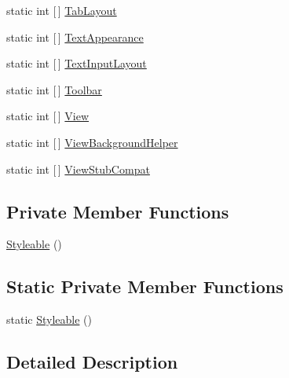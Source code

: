 \begin{DoxyCompactItemize}
\item 
static int \mbox{[}$\,$\mbox{]} \mbox{\hyperlink{class_f_w_p_s___app_1_1_droid_1_1_resource_1_1_styleable_a9f300f2b554385de63a2ce58b4f2ca8e}{Tab\+Layout}}
\item 
static int \mbox{[}$\,$\mbox{]} \mbox{\hyperlink{class_f_w_p_s___app_1_1_droid_1_1_resource_1_1_styleable_a2e843bb3176f9a0b1a185f3d1b6131b6}{Text\+Appearance}}
\item 
static int \mbox{[}$\,$\mbox{]} \mbox{\hyperlink{class_f_w_p_s___app_1_1_droid_1_1_resource_1_1_styleable_ac2d428adf08a5108608b81bd2b5e36e1}{Text\+Input\+Layout}}
\item 
static int \mbox{[}$\,$\mbox{]} \mbox{\hyperlink{class_f_w_p_s___app_1_1_droid_1_1_resource_1_1_styleable_a5c91620973dbbdfc499bef5a1ce514fe}{Toolbar}}
\item 
static int \mbox{[}$\,$\mbox{]} \mbox{\hyperlink{class_f_w_p_s___app_1_1_droid_1_1_resource_1_1_styleable_a483fe91625363184df6a43768c351893}{View}}
\item 
static int \mbox{[}$\,$\mbox{]} \mbox{\hyperlink{class_f_w_p_s___app_1_1_droid_1_1_resource_1_1_styleable_afd87277e995c5df56a1908a09ee81d70}{View\+Background\+Helper}}
\item 
static int \mbox{[}$\,$\mbox{]} \mbox{\hyperlink{class_f_w_p_s___app_1_1_droid_1_1_resource_1_1_styleable_a658cc9dbd5f65375ed53dececc70d17a}{View\+Stub\+Compat}}
\end{DoxyCompactItemize}
\subsection*{Private Member Functions}
\begin{DoxyCompactItemize}
\item 
\mbox{\hyperlink{class_f_w_p_s___app_1_1_droid_1_1_resource_1_1_styleable_a7bfa00b9f496701f47af68e701a6b147}{Styleable}} ()
\end{DoxyCompactItemize}
\subsection*{Static Private Member Functions}
\begin{DoxyCompactItemize}
\item 
static \mbox{\hyperlink{class_f_w_p_s___app_1_1_droid_1_1_resource_1_1_styleable_a00655b19017e31ccc87d77e5a2b821a3}{Styleable}} ()
\end{DoxyCompactItemize}


\subsection{Detailed Description}


